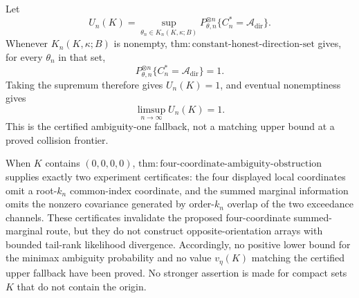 Let
\[
U_n(K)=\sup_{\theta_n\in K_n(K,\kappa;B)}
P_{\theta,n}^{\otimes n}\{C_n^*=\mathcal A_{\mathrm{dir}}\}.
\]
Whenever \(K_n(K,\kappa;B)\) is nonempty, \(\mathrm{thm{:}constant\text{-}honest\text{-}direction\text{-}set}\) gives, for every \(\theta_n\) in that set,
\[
P_{\theta,n}^{\otimes n}\{C_n^*=\mathcal A_{\mathrm{dir}}\}=1.
\]
Taking the supremum therefore gives \(U_n(K)=1\), and eventual nonemptiness gives
\[
\limsup_{n\to\infty}U_n(K)=1.
\]
This is the certified ambiguity-one fallback, not a matching upper bound at a proved collision frontier.

When \(K\) contains \((0,0,0,0)\), \(\mathrm{thm{:}four\text{-}coordinate\text{-}ambiguity\text{-}obstruction}\) supplies exactly two experiment certificates: the four displayed local coordinates omit a root-\(k_n\) common-index coordinate, and the summed marginal information omits the nonzero covariance generated by order-\(k_n\) overlap of the two exceedance channels.  These certificates invalidate the proposed four-coordinate summed-marginal route, but they do not construct opposite-orientation arrays with bounded tail-rank likelihood divergence.  Accordingly, no positive lower bound for the minimax ambiguity probability and no value \(v_\eta(K)\) matching the certified upper fallback have been proved.  No stronger assertion is made for compact sets \(K\) that do not contain the origin.